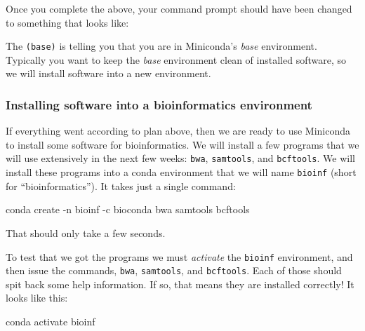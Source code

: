 \documentclass[]{krantz}
\makeatletter
\newenvironment{Shaded}{\begin{snugshade}}{\end{snugshade}}
\newcommand{\ExtensionTok}[1]{#1}
\newcommand{\KeywordTok}[1]{\textcolor[rgb]{0.27,0.27,0.27}{\textbf{#1}}}
\newcommand{\NormalTok}[1]{#1}
\newenvironment{kframe}{%
\medskip{}
\setlength{\fboxsep}{.8em}
 \def\at@end@of@kframe{}%
 \ifinner\ifhmode%
  \def\at@end@of@kframe{\end{minipage}}%
  \begin{minipage}{\columnwidth}%
 \fi\fi%
 \def\FrameCommand##1{\hskip\@totalleftmargin \hskip-\fboxsep
 \colorbox{shadecolor}{##1}\hskip-\fboxsep
     \hskip-\linewidth \hskip-\@totalleftmargin \hskip\columnwidth}%
 \MakeFramed {\advance\hsize-\width
   \@totalleftmargin\z@ \linewidth\hsize
   \@setminipage}}%
 {\par\unskip\endMakeFramed%
 \at@end@of@kframe}
\renewenvironment{Shaded}{\begin{kframe}}{\end{kframe}}
\makeatother
\begin{document}
Once you complete the above, your command prompt should have been changed to something that looks like:

\begin{Shaded}
\end{Shaded}

The \texttt{(base)} is telling you that you are in Miniconda's \emph{base} environment. Typically you want to keep the
\emph{base} environment clean of installed software, so we will install software into a new environment.

\hypertarget{installing-software-into-a-bioinformatics-environment}{%
\subsubsection{Installing software into a bioinformatics environment}\label{installing-software-into-a-bioinformatics-environment}}

If everything went according to plan above, then we are ready to use Miniconda to
install some software for bioinformatics. We will install a few programs that we will
use extensively in the next few weeks: \texttt{bwa}, \texttt{samtools}, and \texttt{bcftools}. We will
install these programs into a conda environment that we will name \texttt{bioinf} (short
for ``bioinformatics''). It takes just a single command:

\begin{Shaded}
\begin{Highlighting}[]
\ExtensionTok{conda}\NormalTok{ create -n bioinf -c bioconda bwa samtools bcftools}
\end{Highlighting}
\end{Shaded}

That should only take a few seconds.

To test that we got the programs we must \emph{activate} the \texttt{bioinf} environment, and then issue
the commands, \texttt{bwa}, \texttt{samtools}, and \texttt{bcftools}. Each of those should spit back some help
information. If so, that means they are installed correctly! It looks like this:

\begin{Shaded}
\begin{Highlighting}[]
\ExtensionTok{conda}\NormalTok{ activate bioinf}
\end{Highlighting}
\end{Shaded}
\end{document}
